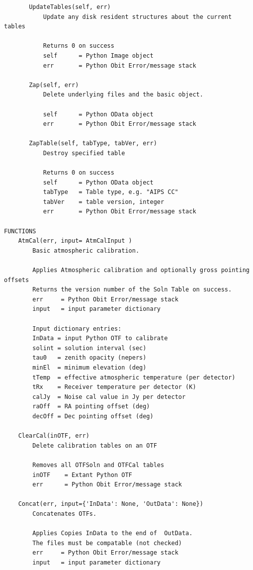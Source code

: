 \documentclass[11pt]{report}
\begin{document}
\begin{verbatim}
       UpdateTables(self, err)
           Update any disk resident structures about the current tables
           
           Returns 0 on success
           self      = Python Image object
           err       = Python Obit Error/message stack
       
       Zap(self, err)
           Delete underlying files and the basic object.
           
           self      = Python OData object
           err       = Python Obit Error/message stack
       
       ZapTable(self, tabType, tabVer, err)
           Destroy specified table
           
           Returns 0 on success
           self      = Python OData object
           tabType   = Table type, e.g. "AIPS CC"
           tabVer    = table version, integer
           err       = Python Obit Error/message stack

FUNCTIONS
    AtmCal(err, input= AtmCalInput )
        Basic atmospheric calibration.
        
        Applies Atmospheric calibration and optionally gross pointing offsets
        Returns the version number of the Soln Table on success.
        err     = Python Obit Error/message stack
        input   = input parameter dictionary
        
        Input dictionary entries:
        InData = input Python OTF to calibrate
        solint = solution interval (sec)
        tau0   = zenith opacity (nepers)
        minEl  = minimum elevation (deg)
        tTemp  = effective atmospheric temperature (per detector)
        tRx    = Receiver temperature per detector (K)
        calJy  = Noise cal value in Jy per detector
        raOff  = RA pointing offset (deg)
        decOff = Dec pointing offset (deg)
    
    ClearCal(inOTF, err)
        Delete calibration tables on an OTF
        
        Removes all OTFSoln and OTFCal tables
        inOTF    = Extant Python OTF
        err      = Python Obit Error/message stack
    
    Concat(err, input={'InData': None, 'OutData': None})
        Concatenates OTFs.
        
        Applies Copies InData to the end of  OutData.
        The files must be compatable (not checked)
        err     = Python Obit Error/message stack
        input   = input parameter dictionary
        

\end{verbatim}
\end{document}
